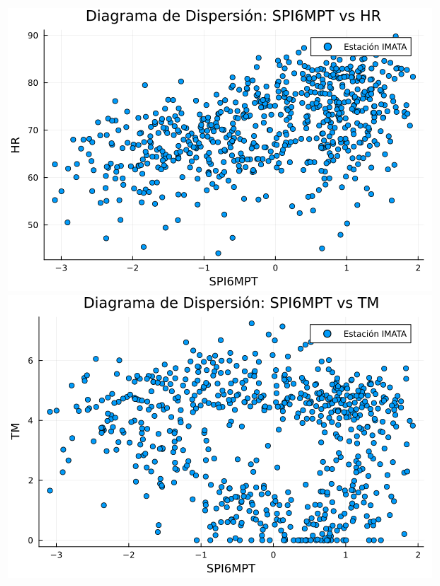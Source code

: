 \begin{figure}[htbp]
\begin{minipage}{0.32\textwidth}
\end{minipage}

\vspace{0.5cm}  %

\begin{minipage}{0.32\textwidth}
    \centering
    \includegraphics[width=\linewidth]{Capitulos/Scaterplot/IMATA_SPI6MPT_vs_HR.png}
\end{minipage}\hfill
\begin{minipage}{0.32\textwidth}
    \centering
    \includegraphics[width=\linewidth]{Capitulos/Scaterplot/IMATA_SPI6MPT_vs_TM.png}
\end{minipage}\hfill
\begin{minipage}{0.32\textwidth}
    \centering

\end{minipage}
\end{figure}

